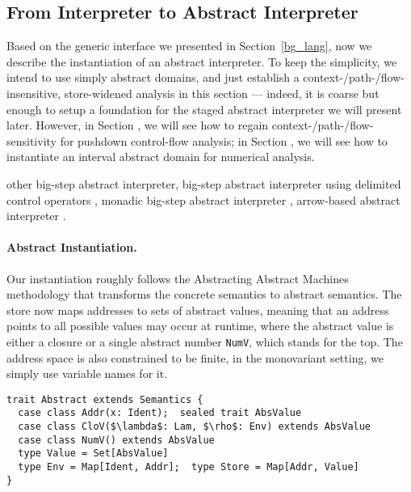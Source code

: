 \subsection{From Interpreter to Abstract Interpreter}

Based on the generic interface we presented in Section~\ref{bg_lang}, now we describe the instantiation of an
abstract interpreter.
To keep the simplicity, we intend to use simply abstract domains, and just establish a 
context-/path-/flow-insensitive, store-widened analysis in this section --- indeed, it is coarse 
but enough to setup a foundation for the staged abstract interpreter we will present later.
However, in Section , we will see how to regain context-/path-/flow-sensitivity 
for pushdown control-flow analysis; in Section , we will see how to instantiate 
an interval abstract domain for numerical analysis.

 other big-step abstract interpreter, 
big-step abstract interpreter using delimited control operators \cite{Wei:2018:RAA:3243631.3236800},
monadic big-step abstract interpreter \cite{DBLP:journals/pacmpl/DaraisLNH17},
arrow-based abstract interpreter \cite{Keidel:2018:CSP:3243631.3236767}.

\paragraph{Abstract Instantiation.}
Our instantiation roughly follows the Abstracting Abstract Machines methodology 
\cite{DBLP:conf/icfp/HornM10, DBLP:journals/jfp/HornM12} that transforms the concrete semantics 
to abstract semantics. The store now maps addresses to sets of abstract values, meaning that an address points
to all possible values may occur at runtime, where the abstract value is either a closure or 
a single abstract number \texttt{NumV}, which stands for the top. The address space is also
constrained to be finite, in the monovariant setting, we simply use variable names for it.

\begin{lstlisting}
trait Abstract extends Semantics {
  case class Addr(x: Ident);  sealed trait AbsValue
  case class CloV($\lambda$: Lam, $\rho$: Env) extends AbsValue
  case class NumV() extends AbsValue
  type Value = Set[AbsValue]
  type Env = Map[Ident, Addr];  type Store = Map[Addr, Value]
}
\end{lstlisting}

